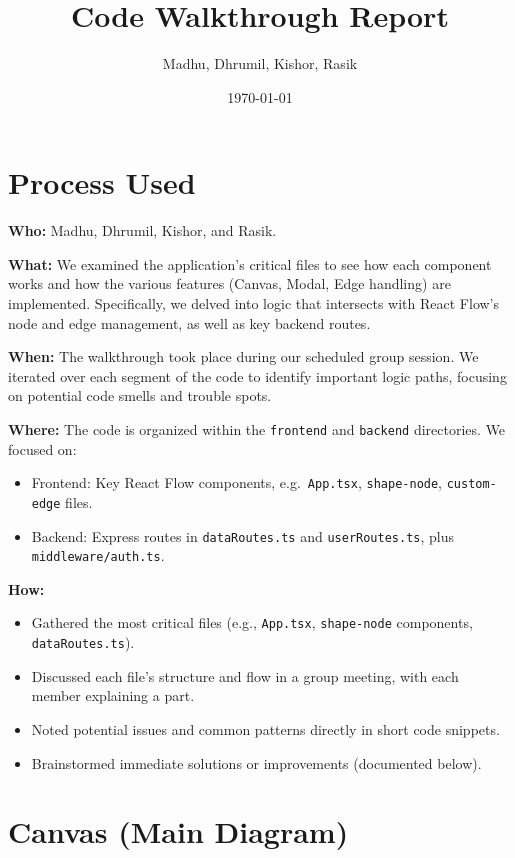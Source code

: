 \documentclass{article}
\title{Code Walkthrough Report}
\author{Madhu, Dhrumil, Kishor, Rasik}
\date{\today}
\begin{document}
\maketitle

\section{Process Used}

\textbf{Who:} Madhu, Dhrumil, Kishor, and Rasik.

\textbf{What:} We examined the application’s critical files to see how each component works and how the various features (Canvas, Modal, Edge handling) are implemented. Specifically, we delved into logic that intersects with React Flow’s node and edge management, as well as key backend routes.

\textbf{When:} The walkthrough took place during our scheduled group session. We iterated over each segment of the code to identify important logic paths, focusing on potential code smells and trouble spots.

\textbf{Where:} The code is organized within the \texttt{frontend} and \texttt{backend} directories. We focused on:
\begin{itemize}
  \item Frontend: Key React Flow components, e.g.\ \texttt{App.tsx}, \texttt{shape-node}, \texttt{custom-edge} files.
  \item Backend: Express routes in \texttt{dataRoutes.ts} and \texttt{userRoutes.ts}, plus \texttt{middleware/auth.ts}.
\end{itemize}

\textbf{How:} 
\begin{itemize}
  \item Gathered the most critical files (e.g., \texttt{App.tsx}, \texttt{shape-node} components, \texttt{dataRoutes.ts}). 
  \item Discussed each file’s structure and flow in a group meeting, with each member explaining a part. 
  \item Noted potential issues and common patterns directly in short code snippets. 
  \item Brainstormed immediate solutions or improvements (documented below).
\end{itemize}

\vspace{1em}

\section{Canvas (Main Diagram)}
\end{document}
